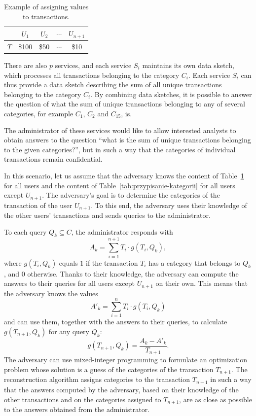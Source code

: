 \begin{table}[htbp]
\centering
\caption{Example of assigning values to transactions.}
\label{tab:przypisanie-cen}
\begin{tabular}{@{}ccccc@{}}
\toprule
 & $U_1$ & $U_2$ & $\cdots$ & $U_{n+1}$ \\
\midrule
$T$ & \$100 & \$50 & $\cdots$ & \$10 \\
\bottomrule
\end{tabular}
\end{table}

There are also $p$ services, and each service $S_i$ maintains its own data sketch, which processes all transactions belonging to the category $C_i$. Each service $S_i$ can thus provide a data sketch describing the sum of all unique transactions belonging to the category $C_i$. By combining data sketches, it is possible to answer the question of what the sum of unique transactions belonging to any of several categories, for example $C_1$, $C_2$ and $C_{15}$, is.

The administrator of these services would like to allow interested analysts to obtain answers to the question ``what is the sum of unique transactions belonging to the given categories?'', but in such a way that the categories of individual transactions remain confidential.

In this scenario, let us assume that the adversary knows the content of Table~\ref{tab:przypisanie-cen} for all users and the content of Table~\ref{tab:przypisanie-kategorii} for all users except $U_{n+1}$. The adversary's goal is to determine the categories of the transaction of the user $U_{n+1}$. To this end, the adversary uses their knowledge of the other users' transactions and sends queries to the administrator.

To each query $Q_k \subseteq C$, the administrator responds with
\[
A_k = \sum_{i=1}^{n+1} T_i \cdot g(T_i, Q_k),
\]
where $g(T_i, Q_k)$ equals $1$ if the transaction $T_i$ has a category that belongs to $Q_k$, and $0$ otherwise. Thanks to their knowledge, the adversary can compute the answers to their queries for all users except $U_{n+1}$ on their own. This means that the adversary knows the values
\[
A'_k = \sum_{i=1}^{n} T_i \cdot g(T_i, Q_k)
\]
and can use them, together with the answers to their queries, to calculate $g(T_{n+1}, Q_k)$ for any query $Q_k$:
\[
g(T_{n+1}, Q_k) = \frac{A_k - A'_k}{T_{n+1}}.
\]
The adversary can use mixed-integer programming to formulate an optimization problem whose solution is a guess of the categories of the transaction $T_{n+1}$. The reconstruction algorithm assigns categories to the transaction $T_{n+1}$ in such a way that the answers computed by the adversary, based on their knowledge of the other transactions and on the categories assigned to $T_{n+1}$, are as close as possible to the answers obtained from the administrator.

